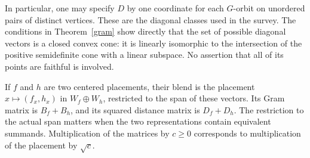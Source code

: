 \documentclass[11pt,a4paper]{article}
\begin{document}
In particular, one may specify $D$ by one coordinate for each $G$-orbit
on unordered pairs of distinct vertices. These are the diagonal classes
used in the survey. The conditions in Theorem~\ref{gram} show directly
that the set of possible diagonal vectors is a closed convex cone: it is
linearly isomorphic to the intersection of the positive semidefinite cone
with a linear subspace. No assertion that all of its points are faithful
is involved.

If $f$ and $h$ are two centered placements, their blend is the placement
$x\mapsto(f_x,h_x)$ in $W_f\oplus W_h$, restricted to the span of these
vectors. Its Gram matrix is $B_f+B_h$, and its squared distance matrix is
$D_f+D_h$. The restriction to the actual span matters when the two
representations contain equivalent summands. Multiplication of the
matrices by $c\geq0$ corresponds to multiplication of the placement by
$\sqrt c$.
\end{document}
